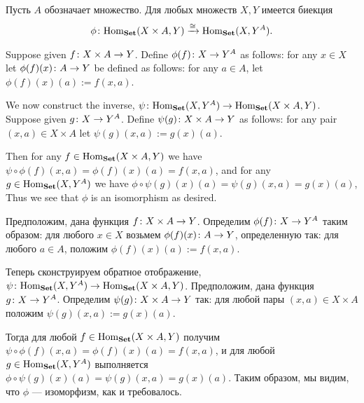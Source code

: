 \documentclass[CT4S-EN-RU]{subfiles}
\begin{document}
\begin{propositionRUS}[Каррирование]\label{prop:curry}
Пусть $A$ обозначает множество. Для любых множеств $X,Y$ имеется биекция%
%
\begin{align}\label{dia:curry bijection}
\phi\colon\textnormal{Hom}_{\mathbf{Set}}(X\times A,Y)\xrightarrow{\cong}\textnormal{Hom}_{\mathbf{Set}}(X,Y^A).
\end{align}
\end{propositionRUS}

\begin{proofENG}
Suppose given $f\colon X\times A\rightarrow Y$. Define $\phi(f)\colon X\rightarrow Y^A$ as follows: for any $x\in X$ let $\phi(f)(x)\colon A\rightarrow Y$ be defined as follows: for any $a\in A$, let $\phi(f)(x)(a):=f(x,a)$. 

We now construct the inverse, $\psi\colon\textnormal{Hom}_{\mathbf{Set}}(X,Y^A)\rightarrow\textnormal{Hom}_{\mathbf{Set}}(X\times A,Y)$. Suppose given $g\colon X\rightarrow Y^A$. Define $\psi(g)\colon X\times A\rightarrow Y$ as follows: for any pair $(x,a)\in X\times A$ let $\psi(g)(x,a):=g(x)(a)$. 

Then for any $f\in\textnormal{Hom}_{\mathbf{Set}}(X\times A,Y)$ we have $\psi\circ\phi(f)(x,a)=\phi(f)(x)(a)=f(x,a)$, and for any $g\in\textnormal{Hom}_{\mathbf{Set}}(X,Y^A)$ we have $\phi\circ\psi(g)(x)(a)=\psi(g)(x,a)=g(x)(a)$, Thus we see that $\phi$ is an isomorphism as desired.
\end{proofENG}

\begin{proofRUS}
Предположим, дана функция $f\colon X\times A\rightarrow Y$. Определим $\phi(f)\colon X\rightarrow Y^A$ таким образом: для любого $x\in X$ возьмем $\phi(f)(x)\colon A\rightarrow Y$, определенную так: для любого $a\in A$, положим $\phi(f)(x)(a):=f(x,a)$. 

Теперь сконструируем обратное отображение, $\psi\colon\textnormal{Hom}_{\mathbf{Set}}(X,Y^A)\rightarrow\textnormal{Hom}_{\mathbf{Set}}(X\times A,Y)$.  Предположим, дана функция $g\colon X\rightarrow Y^A$. Определим $\psi(g)\colon X\times A\rightarrow Y$ так: для любой пары $(x,a)\in X\times A$ положим $\psi(g)(x,a):=g(x)(a)$. 

Тогда для любой $f\in\textnormal{Hom}_{\mathbf{Set}}(X\times A,Y)$ получим $\psi\circ\phi(f)(x,a)=\phi(f)(x)(a)=f(x,a)$, и для любой $g\in\textnormal{Hom}_{\mathbf{Set}}(X,Y^A)$ выполняется $\phi\circ\psi(g)(x)(a)=\psi(g)(x,a)=g(x)(a)$. Таким образом, мы видим, что $\phi$ — изоморфизм, как и требовалось.
\end{proofRUS}
\end{document}
